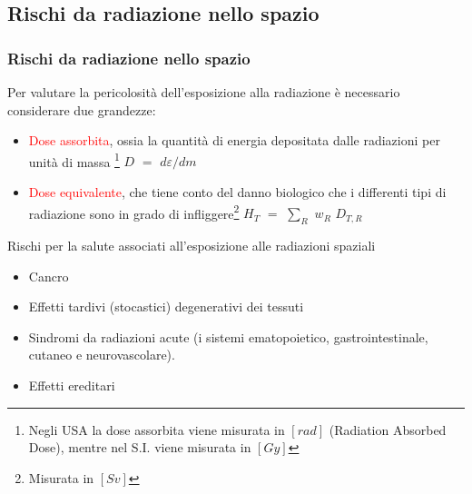 \documentclass[9pt]{beamer}
\begin{document}
\subsection{Rischi da radiazione nello spazio}
\begin{frame} [fragile]
	\frametitle{Rischi da radiazione nello spazio}
Per valutare la pericolosit\`a dell'esposizione alla radiazione \`e necessario considerare due grandezze:
\begin{itemize}
\item \textcolor{red}{Dose assorbita}, ossia la quantit\`a di energia depositata dalle radiazioni per unit\`a di massa \footnote{Negli USA la dose assorbita viene misurata in $[rad]$ (Radiation Absorbed Dose), mentre nel S.I. viene misurata in $[Gy]$} $D$ $=$ $d\varepsilon$$/$$dm$ 
\item \textcolor{red}{Dose equivalente}, che tiene conto del danno biologico che i differenti tipi di radiazione sono in grado di infliggere\footnote{Misurata in $[Sv]$} $H_{T}$ $=$ $\sum_{R}^{}$ $w_{R}$ $D_{T,R}$ 
\end{itemize}

\begin{block}{Rischi per la salute associati all'esposizione alle radiazioni spaziali \cite{saggiatore}}
\begin{itemize}
\item Cancro
\item Effetti tardivi (stocastici) degenerativi dei tessuti
\item Sindromi da radiazioni acute (i sistemi ematopoietico, gastrointestinale, cutaneo e neurovascolare).
\item Effetti ereditari
\end{itemize}
\end{block}
\end{frame}
	
\end{document}
